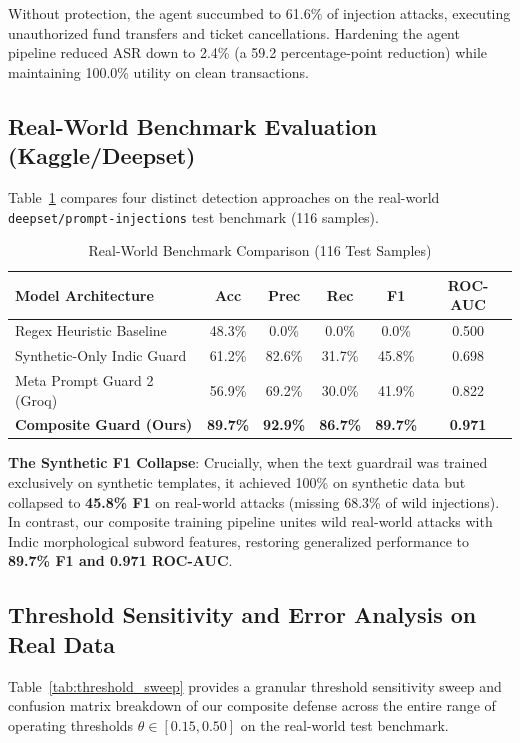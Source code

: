 \documentclass[conference]{IEEEtran}
\begin{document}
Without protection, the agent succumbed to 61.6\% of injection attacks, executing unauthorized fund transfers and ticket cancellations. Hardening the agent pipeline reduced ASR down to 2.4\% (a 59.2 percentage-point reduction) while maintaining 100.0\% utility on clean transactions.

\subsection{Real-World Benchmark Evaluation (Kaggle/Deepset)}
Table~\ref{tab:real_world_eval} compares four distinct detection approaches on the real-world \texttt{deepset/prompt-injections} test benchmark (116 samples).

\begin{table}[h]
\centering
\caption{Real-World Benchmark Comparison (116 Test Samples)}
\label{tab:real_world_eval}
\begin{tabularx}{\columnwidth}{lccccc}
\toprule
\textbf{Model Architecture} & \textbf{Acc} & \textbf{Prec} & \textbf{Rec} & \textbf{F1} & \textbf{ROC-AUC} \\
\midrule
Regex Heuristic Baseline & 48.3\% & 0.0\% & 0.0\% & 0.0\% & 0.500 \\
Synthetic-Only Indic Guard & 61.2\% & 82.6\% & 31.7\% & 45.8\% & 0.698 \\
Meta Prompt Guard 2 (Groq) & 56.9\% & 69.2\% & 30.0\% & 41.9\% & 0.822 \\
\textbf{Composite Guard (Ours)} & \textbf{89.7\%} & \textbf{92.9\%} & \textbf{86.7\%} & \textbf{89.7\%} & \textbf{0.971} \\
\bottomrule
\end{tabularx}
\end{table}

\noindent\textbf{The Synthetic F1 Collapse}: Crucially, when the text guardrail was trained exclusively on synthetic templates, it achieved 100\% on synthetic data but collapsed to \textbf{45.8\% F1} on real-world attacks (missing 68.3\% of wild injections). In contrast, our composite training pipeline unites wild real-world attacks with Indic morphological subword features, restoring generalized performance to \textbf{89.7\% F1 and 0.971 ROC-AUC}.

\subsection{Threshold Sensitivity and Error Analysis on Real Data}
Table~\ref{tab:threshold_sweep} provides a granular threshold sensitivity sweep and confusion matrix breakdown of our composite defense across the entire range of operating thresholds $\theta \in [0.15, 0.50]$ on the real-world test benchmark.
\end{document}
